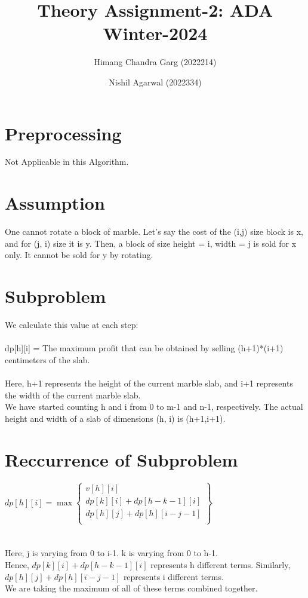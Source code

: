 \documentclass{article}
\title{Theory Assignment-2: ADA Winter-2024}
\author{Himang Chandra Garg (2022214) \and Nishil Agarwal (2022334)}
\date{}
\begin{document}
\maketitle

\section{Preprocessing}
Not Applicable in this Algorithm.


\section{Assumption}
One cannot rotate a block of marble. Let's say the cost of the (i,j) size block is x, and for (j, i) size it is y. Then, a block of size height = i, width = j is sold for x only. It cannot be sold for y by rotating.


\section{Subproblem}
We calculate this value at each step:\\\\
dp[h][i] = The maximum profit that can be obtained by selling (h+1)*(i+1) centimeters of the slab.
\\\\
Here, h+1 represents the height of the current marble slab, and i+1 represents the width of the current marble slab.
\\
We have started counting h and i from 0 to m-1 and n-1, respectively. The actual height and width of a slab of dimensions (h, i) is (h+1,i+1).


\section{Reccurrence of Subproblem }
$dp[h][i] = \max \left\{
\begin{array}{ll}
v[h][i]\\
dp[k][i]+dp[h - k - 1][i]\\
dp[h][j]+dp[h][i - j - 1]\\
\end{array}
\right\}$
\\\\\\
Here, j is varying from 0 to i-1. k is varying from 0 to h-1.\\
Hence, $dp[k][i]+dp[h - k - 1][i]$ represents h different terms. Similarly, $dp[h][j]+dp[h][i - j - 1]$ represents i different terms.\\
We are taking the maximum of all of these terms combined together.
\end{document}
